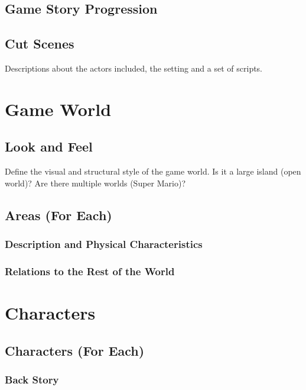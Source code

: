\documentclass[12pt]{article}
\begin{document}
\subsection{Game Story Progression}

\subsection{Cut Scenes}

Descriptions about the actors included, the setting and a set of scripts.

\section{Game World}

\subsection{Look and Feel}

Define the visual and structural style of the game world. Is it a large island (open world)? Are there multiple worlds (Super Mario)?

\subsection{Areas (For Each)}

\subsubsection{Description and Physical Characteristics}

\subsubsection{Relations to the Rest of the World}

\section{Characters}

\subsection{Characters (For Each)}

\subsubsection{Back Story}
\end{document}

